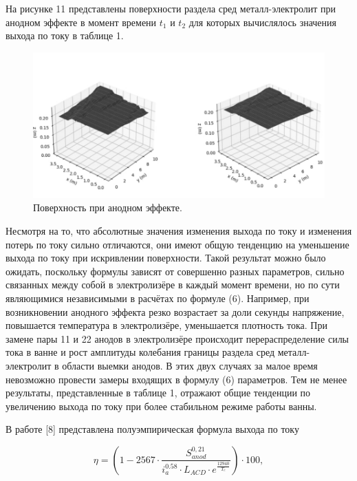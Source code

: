 \documentclass{article}
\begin{document}
На рисунке 11 представлены поверхности раздела сред металл-электролит при анодном эффекте в момент времени $t_1$ и $t_2$ для которых вычислялось значения выхода по току в таблице 1.

\begin{figure}[H]
    \centering
    \includegraphics[width=150mm]{Анодный эффект поверхность.png}
    \caption{Поверхность при анодном эффекте.}
    \label{fig:} 
\end{figure}

Несмотря на то, что абсолютные значения изменения выхода по току и изменения потерь по току сильно отличаются, они имеют общую тенденцию на уменьшение выхода по току при искривлении поверхности. Такой результат можно было ожидать, поскольку формулы зависят от совершенно разных параметров, сильно связанных между собой в электролизёре в каждый момент времени, но по сути являющимися независимыми в расчётах по формуле (6). Например, при возникновении анодного эффекта резко возрастает за доли секунды напряжение, повышается температура в электролизёре, уменьшается плотность тока. При замене пары 11 и 22 анодов в электролизёре происходит перераспределение силы тока в ванне и рост амплитуды колебания границы раздела сред металл-электролит в области выемки анодов. В этих двух случаях за малое время невозможно провести замеры входящих в формулу (6) параметров. Тем не менее результаты, представленные в таблице 1, отражают общие тенденции по увеличению выхода по току при более стабильном режиме работы ванны.

В работе [8] представлена полуэмпирическая формула выхода по току

\begin{equation} \label{eq1}
\eta=(1-2567 \cdot \frac{S^{0,21}_{anod}}{i^{0.58}_a \cdot L_{ACD} \cdot e^{\frac{12940}{T_e}}}) \cdot 100,
\end{equation}
\end{document}
